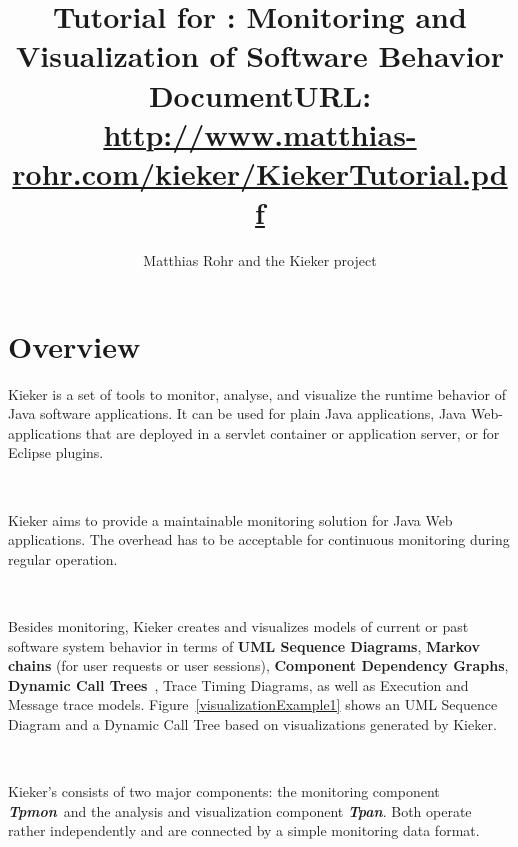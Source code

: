 \documentclass[a4paper,12pt]{scrartcl}
\title{Tutorial for \kieker : Monitoring and Visualization of Software Behavior \\ \small \vspace{3mm} DocumentURL: \href{http://www.matthias-rohr.com/kieker/KiekerTutorial.pdf}{http://www.matthias-rohr.com/kieker/KiekerTutorial.pdf}}
\author{Matthias Rohr and the Kieker project}
\newcommand{\tpmon}{\textit{Tpmon}}
\newcommand{\tpan}{\textit{Tpan}}
\begin{document}
\maketitle
\tableofcontents
\section{Overview}

Kieker is a set of tools to monitor, analyse, and visualize the runtime behavior of Java software applications. It can be used for plain Java applications, Java Web-applications that are deployed in a servlet container or application server, or for Eclipse plugins.

\

Kieker aims to provide a maintainable monitoring solution for Java Web applications. The overhead has to be acceptable for continuous monitoring during regular operation.

\

Besides monitoring, Kieker creates and visualizes models of current or past software system behavior in terms of \textbf{UML Sequence Diagrams}, \textbf{Markov chains} (for user requests or user sessions), \textbf{Component Dependency Graphs}, \textbf{Dynamic Call Trees}~\citep{AmmonsBallLarus97ExploitingHardwarePerformanceCountersWithFlowAndContextSensitiveProfiling},  Trace Timing Diagrams, as well as Execution and Message trace models. Figure~\ref{visualizationExample1} shows an UML Sequence Diagram and a Dynamic Call Tree based on visualizations generated by Kieker.

\

Kieker's consists of two major components: the monitoring component \textbf{\tpmon}\ and the analysis and visualization component \textbf{\tpan}. Both operate rather independently and are connected by a simple monitoring data format. %
\end{document}
